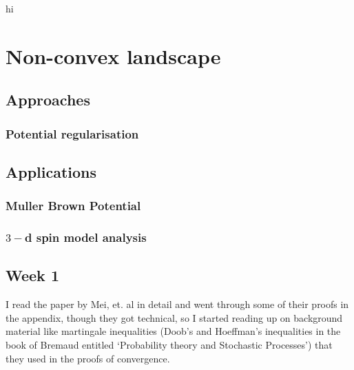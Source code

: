 \documentclass{article}
\begin{document}
\begin{theorem}\label{thm: Doob}

\end{theorem}

\begin{boxlemma}\label{lemma: Hoeffding}
hi
\end{boxlemma}



\section{Non-convex landscape}

\subsection{Approaches}
\subsubsection{Potential regularisation}

\subsection{Applications}

\subsubsection{Muller Brown Potential}

\subsubsection{$ 3-$d spin model analysis}

\subsection{Week 1}

I read the paper by Mei, et. al \cite{Mei_2018} in detail and went through some of their proofs in the appendix, though they got technical, so I started reading up on background material like martingale inequalities (Doob’s and Hoeffman’s inequalities in the book of Bremaud entitled ‘Probability theory and Stochastic Processes’) that they used in the proofs of convergence.\\ 
\end{document}
